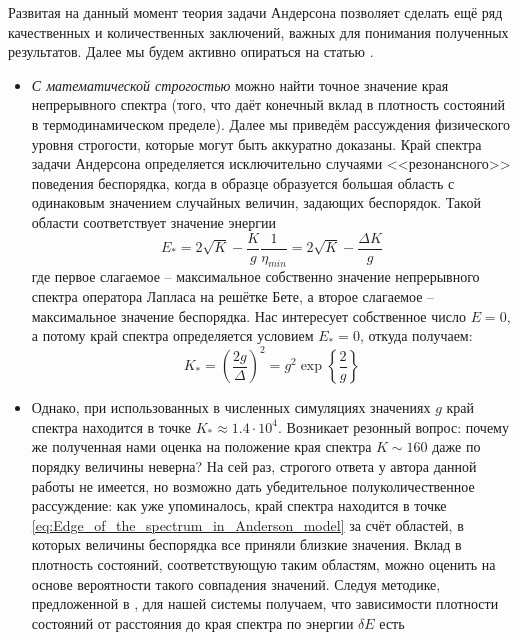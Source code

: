 Развитая на данный момент теория задачи Андерсона позволяет сделать ещё ряд качественных и количественных заключений, важных для понимания полученных результатов. Далее мы будем активно опираться на статью \cite{Biroli_2010}.
\begin{itemize}	
	\item \textit{С математической строгостью} можно найти точное значение края непрерывного спектра (того, что даёт конечный вклад в плотность состояний в термодинамическом пределе). Далее мы приведём рассуждения физического уровня строгости, которые могут быть аккуратно доказаны. Край спектра задачи Андерсона определяется исключительно случаями <<резонансного>> поведения беспорядка, когда в образце образуется большая область с одинаковым значением случайных величин, задающих беспорядок. Такой области соответствует значение энергии
	\begin{equation}
		\label{eq:Edge_energy_Anderson_model}
		E_* = 2 \sqrt{K} - \frac{K}{g} \frac{1}{\eta_{min}} = 2 \sqrt{K} - \frac{\Delta K}{g}
	\end{equation}
	где первое слагаемое -- максимальное собственно значение непрерывного спектра оператора Лапласа на решётке Бете, а второе слагаемое -- максимальное значение беспорядка. Нас интересует собственное число $E = 0$, а потому край спектра определяется условием $E_* = 0$, откуда получаем:
	\begin{equation}
		\label{eq:Edge_of_the_spectrum_in_Anderson_model}
		K_* = \left( \frac{2 g}{\Delta} \right)^2 = g^2 \exp\left\{ \frac{2}{g} \right\}
	\end{equation}
	\item Однако, при использованных в численных симуляциях значениях $g$ край спектра находится в точке $K_* \approx 1.4 \cdot 10^4$. Возникает резонный вопрос: почему же полученная нами оценка на положение края спектра $K \sim 160$ даже по порядку величины неверна? На сей раз, строгого ответа у автора данной работы не имеется, но возможно дать убедительное полуколичественное рассуждение: как уже упоминалось, край спектра находится в точке \eqref{eq:Edge_of_the_spectrum_in_Anderson_model} за счёт областей, в которых величины беспорядка все приняли близкие значения. Вклад в плотность состояний, соответствующую таким областям, можно оценить на основе вероятности такого совпадения значений. Следуя методике, предложенной в \cite{Biroli_2010}, для нашей системы получаем, что зависимости плотности состояний от расстояния до края спектра по энергии $\delta E$ есть
	\begin{equation}

\end{equation}
\end{itemize}
